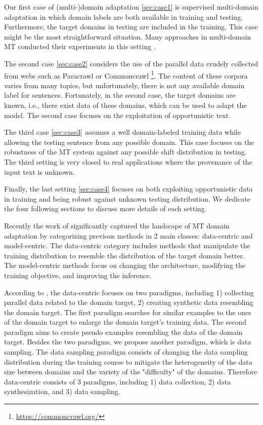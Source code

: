 Our first case of (multi-)domain adaptation \ref{sec:case1} is supervised multi-domain adaptation in which domain labels are both available in training and testing. Furthermore, the target domains in testing are included in the training. This case might be the most straightforward situation. Many approaches in multi-domain MT conducted their experiments in this setting \cite{Pham21revisiting}. 

The second case \ref{sec:case2} considers the use of the parallel data crudely collected from webs such as Paracrawl \citep{Banon20Paracrawl} or Commoncrawl \footnote{\url{https://commoncrawl.org/}}. The content of these corpora varies from many topics, but unfortunately, there is not any available domain label for sentences. Fortunately, in the second case, the target domains are known, i.e., there exist data of these domains, which can be used to adapt the model. The second case focuses on the exploitation of opportunistic text. 

The third case \ref{sec:case3} assumes a well domain-labeled training data while allowing the testing sentence from any possible domain. This case focuses on the robustness of the MT system against any possible shift distribution in testing. The third setting is very closed to real applications where the provenance of the input text is unknown. 

Finally, the last setting \ref{sec:case4} focuses on both exploiting opportunistic data in training and being robust against unknown testing distribution. We dedicate the four following sections to discuss more details of each setting.

Recently the work of \citet{Chu18survey} significantly captured the landscape of MT domain adaptation by categorizing previous methods in 2 main classes: data-centric and model-centric. The data-centric category includes methods that manipulate the training distribution to resemble the distribution of the target domain better. The model-centric methods focus on changing the architecture, modifying the training objective, and improving the inference.

According to \citet{Chu18asurvey}, the data-centric focuses on two paradigms, including 1) collecting parallel data related to the domain target, 2) creating synthetic data resembling the domain target. The first paradigm searches for similar examples to the ones of the domain target to enlarge the domain target's training data. The second paradigm aims to create pseudo examples resembling the data of the domain target. Besides the two paradigms, we propose another paradigm, which is data sampling. The data sampling paradigm consists of changing the data sampling distribution during the training course to mitigate the heterogeneity of the data size between domains and the variety of the "difficulty" of the domains. Therefore data-centric consists of 3 paradigms, including 1) data collection, 2) data synthesization, and 3) data sampling.

